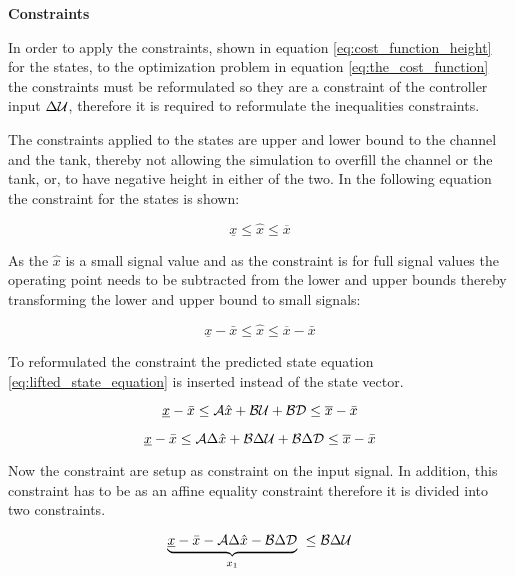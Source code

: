\textbf{Constraints}

In order to apply the constraints, shown in equation \ref{eq:cost_function_height} for the states, to the optimization problem in equation \ref{eq:the_cost_function} the constraints must be reformulated so they are a constraint of the controller input $\Delta\CMcal{U}$, therefore it is required to reformulate the inequalities constraints. 

The constraints applied to the states are upper and lower bound to the channel and the tank, thereby not allowing the simulation to overfill the channel or the tank, or, to have negative height in either of the two. In the following equation the constraint for the states is shown:  


\begin{equation}
	\underline{x} \leq \hat{x} \leq \overline{x}
\end{equation}

As the $\hat{x}$ is a small signal value and as the constraint is for full signal values the operating point needs to be subtracted from the lower and upper bounds thereby transforming the lower and upper bound to small signals:

\begin{equation}
	\underline{x}- \bar{x} \leq \hat{x} \leq \overline{x}-\bar{x}
\end{equation}

To reformulated the constraint the predicted state equation \ref{eq:lifted_state_equation} is inserted instead of the state vector.

\begin{equation}
 	\underline{x}- \bar{x} \leq \CMcal{A}\hat{x}+\CMcal{B}\CMcal{U}+\CMcal{BD} \leq \overline{x}-\bar{x}
 \end{equation} 



\begin{equation}
 	\underline{x}- \bar{x} \leq \CMcal{A}\Delta\hat{x}+\CMcal{B}\Delta\CMcal{U}+\CMcal{B}\Delta\CMcal{D} \leq \overline{x}-\bar{x}
 \end{equation} 


 Now the constraint are setup as constraint on the input signal. In addition, this constraint has to be as an affine equality constraint therefore it is divided into two constraints. 

 \begin{equation}
   	\underbrace{\underline{x}- \bar{x}-\CMcal{A}\Delta\hat{x}-\CMcal{B}\Delta\CMcal{D}}_{x_1}\  \leq \CMcal{B}\Delta\CMcal{U}
 \end{equation}  

